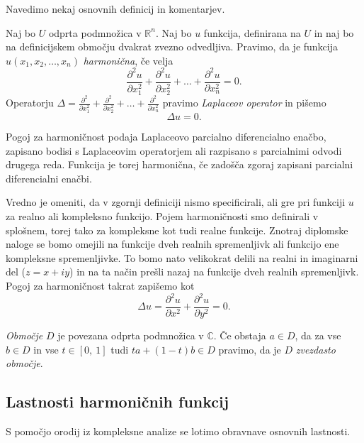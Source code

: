 \documentclass[mat1, tisk]{fmfdelo}
\begin{document}
    Navedimo nekaj osnovnih definicij in komentarjev. 

    \begin{definicija}
        \label{harm}
        Naj bo $U$ odprta podmnožica v $\mathbb{R}^n$. Naj bo $u$ funkcija, definirana na $U$ in naj bo na definicijskem območju dvakrat zvezno odvedljiva.  
        Pravimo, da je funkcija $u(x_1, x_2, \dots, x_n)$ \emph{harmonična}, če velja
        $$
        \frac{\partial^2 u}{\partial x_1 ^ 2} +  \frac{\partial^2 u}{\partial x_2 ^ 2} + \dots + \frac{\partial^2 u}{\partial x_n ^ 2} = 0.
        $$
        Operatorju $\Delta  = \frac{\partial^2}{\partial x_1 ^ 2} +  \frac{\partial^2}{\partial x_2 ^ 2} + \dots + \frac{\partial^2}{\partial x_n ^ 2}$ pravimo \emph{Laplaceov operator} in pišemo
        $$
        \Delta u = 0.
        $$
    \end{definicija}

    Pogoj za harmoničnost podaja Laplaceovo parcialno diferencialno enačbo, zapisano bodisi s Laplaceovim operatorjem ali razpisano s parcialnimi odvodi drugega reda. 
    Funkcija je torej harmonična, če zadošča zgoraj zapisani parcialni diferencialni enačbi. 

    Vredno je omeniti, da v zgornji definiciji nismo specificirali, ali gre pri funkciji $u$ za realno ali kompleksno funkcijo. 
    Pojem harmoničnosti smo definirali v splošnem, torej tako za kompleksne kot tudi realne funkcije.
    Znotraj diplomske naloge se bomo omejili na funkcije dveh realnih spremenljivk ali funkcijo ene kompleksne spremenljivke. To bomo nato velikokrat delili na realni in imaginarni del ($z = x + iy $) in na ta način prešli nazaj na funkcije dveh realnih spremenljivk.
    Pogoj za harmoničnost takrat zapišemo kot
        $$
            \Delta u = \frac{\partial^2 u}{\partial x ^ 2} +  \frac{\partial^2 u}{\partial y ^ 2}= 0.
        $$

    \begin{definicija}
        \emph{Območje} $D$ je povezana odprta podmnožica v $\mathbb{C}$.
        Če obstaja $a \in D$, da za vse $b \in D$ in vse $t \in [0,~1]$ tudi $t a + (1-t)b \in D$ pravimo, da je $D$ \emph{zvezdasto območje}.
    \end{definicija}

\subsection{Lastnosti harmoničnih funkcij}

    S pomočjo orodij iz kompleksne analize se lotimo obravnave osnovnih lastnosti. 
\end{document}
